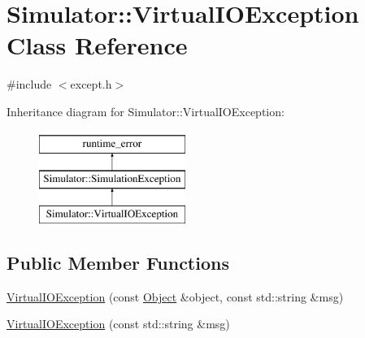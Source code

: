 \hypertarget{class_simulator_1_1_virtual_i_o_exception}{\section{Simulator\+:\+:Virtual\+I\+O\+Exception Class Reference}
\label{class_simulator_1_1_virtual_i_o_exception}
}


{\ttfamily \#include $<$except.\+h$>$}

Inheritance diagram for Simulator\+:\+:Virtual\+I\+O\+Exception\+:\begin{figure}[H]
\begin{center}
\leavevmode
\includegraphics[height=3.000000cm]{class_simulator_1_1_virtual_i_o_exception}
\end{center}
\end{figure}
\subsection*{Public Member Functions}
\begin{DoxyCompactItemize}
\item 
\hyperlink{class_simulator_1_1_virtual_i_o_exception_a49996dd04807235e816f2189123f99e2}{Virtual\+I\+O\+Exception} (const \hyperlink{class_simulator_1_1_object}{Object} \&object, const std\+::string \&msg)
\item 
\hyperlink{class_simulator_1_1_virtual_i_o_exception_a06929c2f98a56b21d10d7319e3a9ef61}{Virtual\+I\+O\+Exception} (const std\+::string \&msg)
\end{DoxyCompactItemize}


